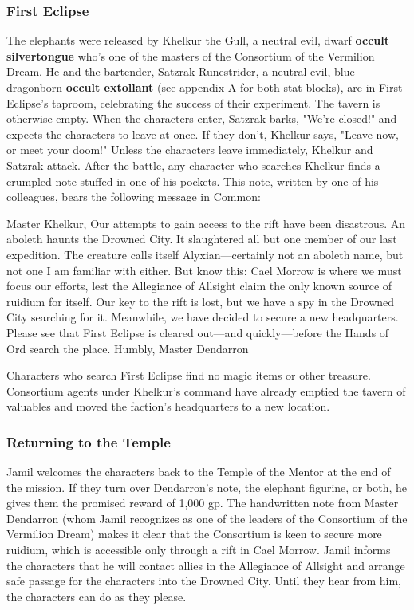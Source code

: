 \documentclass[10pt,a4,twoside,twocolumn,openany,nodeprecatedcode]{dndbook}
\begin{document}
\subsubsection{First Eclipse}
The elephants were released by Khelkur the Gull, a neutral evil, dwarf \textbf{occult silvertongue} who's one of the masters of the Consortium of the Vermilion Dream. He and the bartender, Satzrak Runestrider, a neutral evil, blue dragonborn \textbf{occult extollant} (see appendix A for both stat blocks), are in First Eclipse's taproom, celebrating the success of their experiment. The tavern is otherwise empty.
When the characters enter, Satzrak barks, "We're closed!" and expects the characters to leave at once. If they don't, Khelkur says, "Leave now, or meet your doom!"
Unless the characters leave immediately, Khelkur and Satzrak attack.
After the battle, any character who searches Khelkur finds a crumpled note stuffed in one of his pockets. This note, written by one of his colleagues, bears the following message in Common:
\begin{DndReadAloud}{}
Master Khelkur,
Our attempts to gain access to the rift have been disastrous. An aboleth haunts the Drowned City. It slaughtered all but one member of our last expedition. The creature calls itself Alyxian—certainly not an aboleth name, but not one I am familiar with either. But know this: Cael Morrow is where we must focus our efforts, lest the Allegiance of Allsight claim the only known source of ruidium for itself.
Our key to the rift is lost, but we have a spy in the Drowned City searching for it. Meanwhile, we have decided to secure a new headquarters. Please see that First Eclipse is cleared out—and quickly—before the Hands of Ord search the place.
Humbly, Master Dendarron
\end{DndReadAloud}

Characters who search First Eclipse find no magic items or other treasure. Consortium agents under Khelkur's command have already emptied the tavern of valuables and moved the faction's headquarters to a new location.
\subsubsection{Returning to the Temple}
Jamil welcomes the characters back to the Temple of the Mentor at the end of the mission. If they turn over Dendarron's note, the elephant figurine, or both, he gives them the promised reward of 1,000 gp.
The handwritten note from Master Dendarron (whom Jamil recognizes as one of the leaders of the Consortium of the Vermilion Dream) makes it clear that the Consortium is keen to secure more ruidium, which is accessible only through a rift in Cael Morrow. Jamil informs the characters that he will contact allies in the Allegiance of Allsight and arrange safe passage for the characters into the Drowned City. Until they hear from him, the characters can do as they please.
\end{document}
